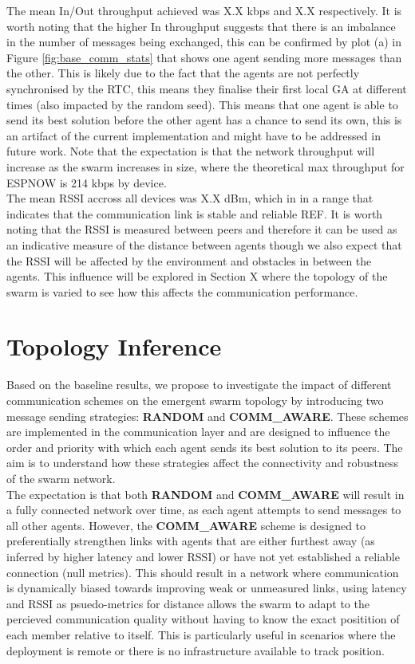 \documentclass[conference]{IEEEtran}
\begin{document}
The mean In/Out throughput achieved was X.X kbps and X.X respectively. It is worth noting that the higher In throughput suggests that there is an imbalance in the number of messages being exchanged, this can be confirmed by plot (a) in Figure \ref{fig:base_comm_stats} that shows one agent sending more messages than the other. This is likely due to the fact that the agents are not perfectly synchronised by the RTC, this means they finalise their first local GA at different times (also impacted by the random seed). This means that one agent is able to send its best solution before the other agent has a chance to send its own, this is an artifact of the current implementation and might have to be addressed in future work. Note that the expectation is that the network throughput will increase as the swarm increases in size, where the theoretical max throughput for ESPNOW is 214 kbps by device.\\ 

The mean RSSI accross all devices was X.X dBm, which in in a range that indicates that the communication link is stable and reliable REF. It is worth noting that the RSSI is measured between peers and therefore it can be used as an indicative measure of the distance between agents though we also expect that the RSSI will be affected by the environment and obstacles in between the agents. This influence will be explored in Section X where the topology of the swarm is varied to see how this affects the communication performance.\\

\section{Topology Inference}

Based on the baseline results, we propose to investigate the impact of different communication schemes on the emergent swarm topology by introducing two message sending strategies: \textbf{RANDOM} and \textbf{COMM\_AWARE}. These schemes are implemented in the communication layer and are designed to influence the order and priority with which each agent sends its best solution to its peers. The aim is to understand how these strategies affect the connectivity and robustness of the swarm network.\\

The expectation is that both \textbf{RANDOM} and \textbf{COMM\_AWARE} will result in a fully connected network over time, as each agent attempts to send messages to all other agents. However, the \textbf{COMM\_AWARE} scheme is designed to preferentially strengthen links with agents that are either furthest away (as inferred by higher latency and lower RSSI) or have not yet established a reliable connection (null metrics). This should result in a network where communication is dynamically biased towards improving weak or unmeasured links, using latency and RSSI as psuedo-metrics for distance allows the swarm to adapt to the percieved communication quality without having to know the exact positition of each member relative to itself. This is particularly useful in scenarios where the deployment is remote or there is no infrastructure available to track position.\\
\end{document}
